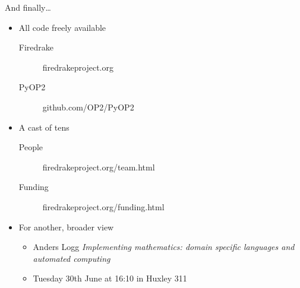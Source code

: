 \documentclass[presentation]{beamer}
\begin{document}
\begin{frame}[label=sec-4-6]{And finally\ldots{}}
\begin{itemize}
\item All code freely available
\begin{description}
\item[{Firedrake}] firedrakeproject.org
\item[{PyOP2}] github.com/OP2/PyOP2
\end{description}

\item A cast of tens
\begin{description}
\item[{People}] firedrakeproject.org/team.html
\item[{Funding}] firedrakeproject.org/funding.html
\end{description}

\item For another, broader view
\begin{itemize}
\item Anders Logg \emph{Implementing mathematics: domain specific languages and automated computing}
\item Tuesday 30th June at 16:10 in Huxley 311
\end{itemize}
\end{itemize}
\end{frame}
\end{document}

